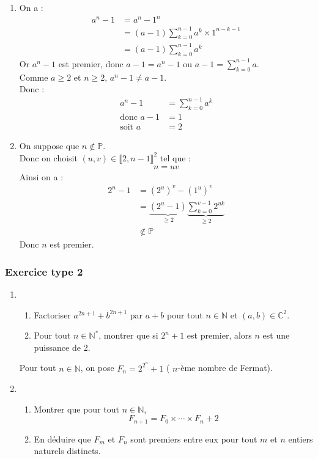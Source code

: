 \documentclass[titlepage, twoside]{report}
\begin{document}
\begin{enumerate}
\item On a :
\begin{align*}
    a^n - 1 &= a^n - 1^n \\
    &= (a-1) \sum_{k=0}^{n-1} a^k \times 1^{n-k-1} \\
    &= (a-1) \sum_{k=0}^{n-1} a^k
\end{align*}
Or $a^n - 1$ est premier, donc $a-1 = a^n - 1$ ou $a-1 = \sum\limits_{k=0}^{n-1} a$. \\
Comme $a \geq 2$ et $n \geq 2$, $a^n - 1 \neq a - 1$. \\
Donc : 
\begin{align*}
    a^n - 1 &= \sum_{k=0}^{n-1} a^k \\
    \text{donc } a - 1 &= 1 \\
    \text{soit } a &= 2
\end{align*}

\item On suppose que $n \not\in \mathbb{P}$. \\
Donc on choisit $(u,v) \in \llbracket 2, n-1 \rrbracket^2$ tel que : 
\begin{align*}
    n = uv
\end{align*}
Ainsi on a : 
\begin{align*}
    2^n - 1 &= (2^u)^v - (1^u)^v \\
    &= \underbrace{(2^u - 1)}_{\geq 2} \underbrace{\sum_{k=0}^{v-1} 2^{uk}}_{\geq 2} \\
    &\not\in \mathbb{P}
\end{align*}
Donc $n$ est premier.
\end{enumerate}


\subsubsection{Exercice type 2}
\begin{tcolorbox}[title=Exercice 2, title filled=false, colframe=darkgreen, colback=darkgreen!10!white]
    \begin{enumerate}
        \item \begin{enumerate}
            \item Factoriser $a^{2 n+1}+b^{2 n+1}$ par $a+b$ pour tout $n \in \mathbb{N}$ et $(a, b) \in \mathbb{C}^2$.
            \item Pour tout $n \in \mathbb{N}^*$, montrer que si $2^n+1$ est premier, alors $n$ est une puissance de 2.
        \end{enumerate}
    Pour tout $n \in \mathbb{N}$, on pose $F_n=2^{2^n}+1$ ( $n$-ème nombre de Fermat).
    \item \begin{enumerate}
        \item Montrer que pour tout $n \in \mathbb{N}$,
        $$F_{n+1}=F_0 \times \cdots \times F_n+2$$
        \item En déduire que $F_m$ et $F_n$ sont premiers entre eux pour tout $m$ et $n$ entiers naturels distincts.
    \end{enumerate}
\end{enumerate}
\end{tcolorbox}
\end{document}
